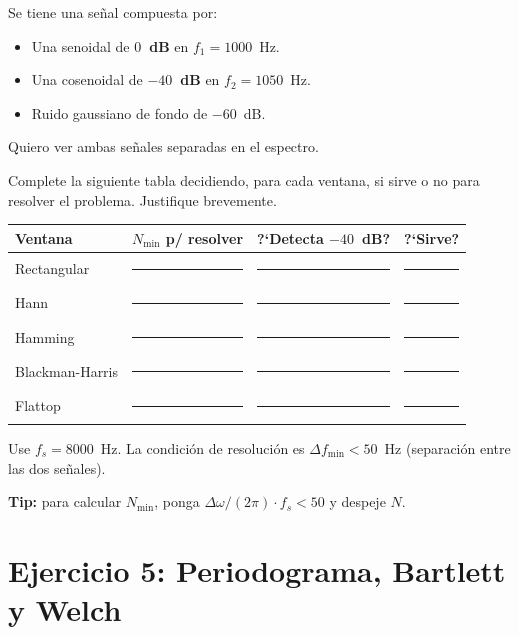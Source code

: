\documentclass[11pt, a4paper]{article}
\begin{document}
\begin{enun}
Se tiene una se\~nal compuesta por:
\begin{itemize}[noitemsep]
  \item Una senoidal de \textbf{$0$~dB} en $f_1 = 1000$~Hz.
  \item Una cosenoidal de \textbf{$-40$~dB} en $f_2 = 1050$~Hz.
  \item Ruido gaussiano de fondo de $-60$~dB.
\end{itemize}
Quiero ver ambas se\~nales separadas en el espectro.

Complete la siguiente tabla decidiendo, para cada ventana, si sirve o no
para resolver el problema. Justifique brevemente.

\medskip
\begin{center}
\small
\begin{tabular}{lccc}
\toprule
Ventana & $N_{\min}$ p/ resolver & ?`Detecta $-40$~dB? & ?`Sirve? \\
\midrule
Rectangular     & \rule{2cm}{0.3pt} & \rule{1cm}{0.3pt} & \rule{1.5cm}{0.3pt} \\
Hann            & \rule{2cm}{0.3pt} & \rule{1cm}{0.3pt} & \rule{1.5cm}{0.3pt} \\
Hamming         & \rule{2cm}{0.3pt} & \rule{1cm}{0.3pt} & \rule{1.5cm}{0.3pt} \\
Blackman-Harris & \rule{2cm}{0.3pt} & \rule{1cm}{0.3pt} & \rule{1.5cm}{0.3pt} \\
Flattop         & \rule{2cm}{0.3pt} & \rule{1cm}{0.3pt} & \rule{1.5cm}{0.3pt} \\
\bottomrule
\end{tabular}
\end{center}

Use $f_s = 8000$~Hz. La condici\'on de resoluci\'on es
$\Delta f_{\min} < 50$~Hz (separaci\'on entre las dos se\~nales).

\textbf{Tip:} para calcular $N_{\min}$, ponga
$\Delta\omega / (2\pi) \cdot f_s < 50$ y despeje $N$.
\end{enun}

\section*{Ejercicio 5: Periodograma, Bartlett y Welch}
\end{document}
